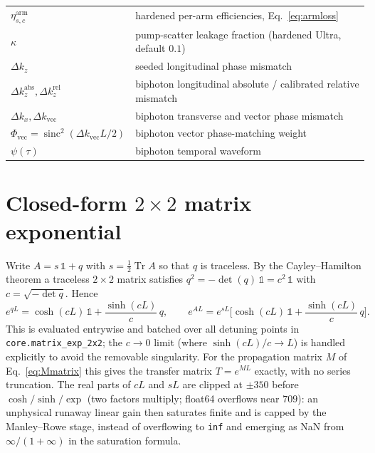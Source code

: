 \documentclass[11pt]{article}
\newcommand{\Tr}{\operatorname{Tr}}
\newcommand{\sinc}{\operatorname{sinc}}
\newcommand{\code}[1]{\texttt{#1}}
\begin{document}
\begin{center}
\begin{tabular}{ll}
$\eta_{s,c}^{\text{arm}}$ & hardened per-arm efficiencies, Eq.~\eqref{eq:armloss} \\
$\kappa$ & pump-scatter leakage fraction (hardened Ultra, default $0.1$) \\
$\Delta k_z$ & seeded longitudinal phase mismatch \\
$\Delta k_z^{\text{abs}},\Delta k_z^{\text{rel}}$ & biphoton longitudinal absolute / calibrated relative mismatch \\
$\Delta k_x,\Delta k_{\text{vec}}$ & biphoton transverse and vector phase mismatch \\
$\Phi_{\text{vec}}=\sinc^2(\Delta k_{\text{vec}} L/2)$ & biphoton vector phase-matching weight \\
$\psi(\tau)$ & biphoton temporal waveform \\
\bottomrule
\end{tabular}
\end{center}

\section{Closed-form \boldmath$2\times2$ matrix exponential}
\label{app:expm}

Write $A=s\,\mathbb{1}+q$ with $s=\tfrac12\Tr A$ so that $q$ is traceless. By the
Cayley--Hamilton theorem a traceless $2\times2$ matrix satisfies
$q^2=-\det(q)\,\mathbb{1}=c^2\,\mathbb{1}$ with $c=\sqrt{-\det q}$. Hence
\begin{equation}
e^{qL}=\cosh(cL)\,\mathbb{1}+\frac{\sinh(cL)}{c}\,q,
\qquad
e^{AL}=e^{sL}\Big[\cosh(cL)\,\mathbb{1}+\frac{\sinh(cL)}{c}\,q\Big].
\end{equation}
This is evaluated entrywise and batched over all detuning points in
\code{core.matrix\_exp\_2x2}; the $c\to0$ limit (where $\sinh(cL)/c\to L$) is
handled explicitly to avoid the removable singularity. For the propagation matrix
$M$ of Eq.~\eqref{eq:Mmatrix} this gives the transfer matrix $T=e^{ML}$ exactly,
with no series truncation. The real parts of $cL$ and $sL$ are clipped at
$\pm350$ before $\cosh/\sinh/\exp$ (two factors multiply; float64 overflows near
$709$): an unphysical runaway linear gain then saturates finite and is capped by
the Manley--Rowe stage, instead of overflowing to \code{inf} and emerging as NaN
from $\infty/(1+\infty)$ in the saturation formula.
\end{document}
